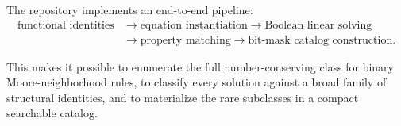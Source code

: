 \documentclass[11pt,a4paper]{article}
\begin{document}
The repository implements an end-to-end pipeline:
\[
\begin{aligned}
\text{functional identities}
&\rightarrow
\text{equation instantiation}
\rightarrow
\text{Boolean linear solving} \\
&\rightarrow
\text{property matching}
\rightarrow
\text{bit-mask catalog construction}.
\end{aligned}
\]

This makes it possible to enumerate the full number-conserving class for binary
Moore-neighborhood rules, to classify every solution against a broad family of structural
identities, and to materialize the rare subclasses in a compact searchable catalog.



\end{document}
